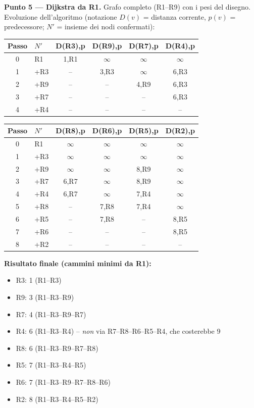 \documentclass[12pt, a4paper]{article}
\begin{document}
\textbf{Punto 5 --- Dijkstra da R1.} Grafo completo (R1--R9) con i pesi del disegno. Evoluzione dell'algoritmo (notazione $D(v)$ = distanza corrente, $p(v)$ = predecessore; $N'$ = insieme dei nodi confermati):

\begin{center}
\scriptsize
\begin{tabular}{|c|l|c|c|c|c|}
\hline
\textbf{Passo} & \textbf{$N'$} & \textbf{D(R3),p} & \textbf{D(R9),p} & \textbf{D(R7),p} & \textbf{D(R4),p} \\
\hline
0 & R1 & 1,R1 & $\infty$ & $\infty$ & $\infty$ \\
1 & +R3 & -- & 3,R3 & $\infty$ & 6,R3 \\
2 & +R9 & -- & -- & 4,R9 & 6,R3 \\
3 & +R7 & -- & -- & -- & 6,R3 \\
4 & +R4 & -- & -- & -- & -- \\
\hline
\end{tabular}

\vspace{2mm}
\begin{tabular}{|c|l|c|c|c|c|}
\hline
\textbf{Passo} & \textbf{$N'$} & \textbf{D(R8),p} & \textbf{D(R6),p} & \textbf{D(R5),p} & \textbf{D(R2),p} \\
\hline
0 & R1 & $\infty$ & $\infty$ & $\infty$ & $\infty$ \\
1 & +R3 & $\infty$ & $\infty$ & $\infty$ & $\infty$ \\
2 & +R9 & $\infty$ & $\infty$ & 8,R9 & $\infty$ \\
3 & +R7 & 6,R7 & $\infty$ & 8,R9 & $\infty$ \\
4 & +R4 & 6,R7 & $\infty$ & 7,R4 & $\infty$ \\
5 & +R8 & -- & 7,R8 & 7,R4 & $\infty$ \\
6 & +R5 & -- & 7,R8 & -- & 8,R5 \\
7 & +R6 & -- & -- & -- & 8,R5 \\
8 & +R2 & -- & -- & -- & -- \\
\hline
\end{tabular}
\end{center}

\textbf{Risultato finale (cammini minimi da R1):}
\begin{itemize}
    \item R3: 1 (R1--R3)
    \item R9: 3 (R1--R3--R9)
    \item R7: 4 (R1--R3--R9--R7)
    \item R4: 6 (R1--R3--R4) \quad -- \textit{non} via R7--R8--R6--R5--R4, che costerebbe 9
    \item R8: 6 (R1--R3--R9--R7--R8)
    \item R5: 7 (R1--R3--R4--R5)
    \item R6: 7 (R1--R3--R9--R7--R8--R6)
    \item R2: 8 (R1--R3--R4--R5--R2)
\end{itemize}
\end{document}
